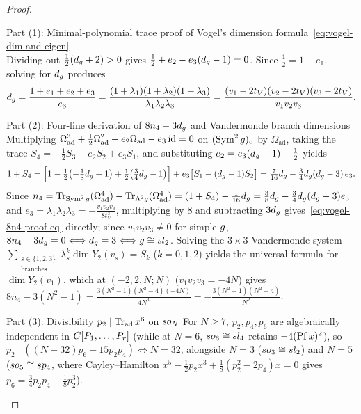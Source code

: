 \begin{proof}
\begin{proofpart}{Part (1): Minimal-polynomial trace proof of Vogel's dimension formula~\eqref{eq:vogel-dim-and-eigen}}
\[\]
Dividing out $\frac{1}{2}(d_{g} + 2) > 0$ gives $\frac{1}{2} + e_2 - e_3(d_{g} - 1) = 0$. Since $\frac{1}{2} = 1 + e_1$, solving for $d_{g}$ produces
\[
d_{g} = \frac{1 + e_1 + e_2 + e_3}{e_3} = \frac{(1 + \lambda_1)(1 + \lambda_2)(1 + \lambda_3)}{\lambda_1\lambda_2\lambda_3} = \frac{(v_1 - 2t_V)(v_2 - 2t_V)(v_3 - 2t_V)}{v_1 v_2 v_3}.
\]
\end{proofpart}
\begin{proofpart}{Part (2): Four-line derivation of $8n_4 - 3d_{g}$ and Vandermonde branch dimensions}
Multiplying $\Omega_{\mathrm{ad}}^3 + \frac{1}{2}\Omega_{\mathrm{ad}}^2 + e_2\Omega_{\mathrm{ad}} - e_3\operatorname{id} = 0$ on $(\operatorname{Sym}^2g)_\circ$ by $\Omega_{\mathrm{ad}}$, taking the trace $S_4 = -\frac{1}{2}S_3 - e_2 S_2 + e_3 S_1$, and substituting $e_2 = e_3(d_{g}-1) - \frac{1}{2}$ yields
\[
1 + S_4 = \Bigl[1 - \tfrac{1}{2}\bigl(-\tfrac{1}{8}d_{g}+1\bigr) + \tfrac{1}{2}\bigl(\tfrac{3}{4}d_{g}-1\bigr)\Bigr] + e_3\bigl[S_1 - (d_{g}-1)S_2\bigr] = \tfrac{7}{16}d_{g} - \tfrac{3}{4}d_{g}(d_{g}-3)\,e_3.
\]
Since $n_4 = \operatorname{Tr}_{\operatorname{Sym}^2g}(\Omega_{\mathrm{ad}}^4) - \operatorname{Tr}_{\Lambda^2g}(\Omega_{\mathrm{ad}}^4) = (1 + S_4) - \frac{1}{16}d_{g} = \frac{3}{8}d_{g} - \frac{3}{4}d_{g}(d_{g}-3)e_3$ and $e_3 = \lambda_1\lambda_2\lambda_3 = -\frac{v_1 v_2 v_3}{8t_V^3}$, multiplying by $8$ and subtracting $3d_{g}$ gives~\eqref{eq:vogel-8n4-proof-eq} directly; since $v_1 v_2 v_3 \neq 0$ for simple $g$, $8n_4 - 3d_{g} = 0 \Longleftrightarrow d_{g} = 3 \Longleftrightarrow g \cong sl_2$. Solving the $3\times 3$ Vandermonde system $\sum_{\substack{s\in\{1,2,3\}\\\mathrm{branches}}}\lambda_s^k\dim Y_2(v_s) = S_k$ ($k=0,1,2$) yields the universal formula for $\dim Y_2(v_1)$, which at $(-2,2,N;N)$ ($v_1 v_2 v_3 = -4N$) gives $8n_4 - 3(N^2-1) = \frac{3(N^2-1)(N^2-4)(-4N)}{4N^3} = -\frac{3(N^2-1)(N^2-4)}{N^2}$.
\end{proofpart}
\begin{proofpart}{Part (3): Divisibility $p_2 \mid \operatorname{Tr}_{\mathrm{ad}}x^6$ on $so_N$}
For $N \ge 7$, $p_2, p_4, p_6$ are algebraically independent in $C[P_1,\dots,P_r]$ (while at $N=6$, $so_6\cong sl_4$ retains $-4(\operatorname{Pf} x)^2$), so $p_2 \mid ((N-32)p_6 + 15p_2 p_4) \Longleftrightarrow N = 32$, alongside $N=3$ ($so_3\cong sl_2$) and $N=5$ ($so_5\cong sp_4$, where Cayley--Hamilton $x^5 - \frac{1}{2}p_2 x^3 + \frac{1}{8}(p_2^2-2p_4)x = 0$ gives $p_6 = \frac{3}{4}p_2 p_4 - \frac{1}{8}p_2^3$).
\end{proofpart}
\end{proof}

